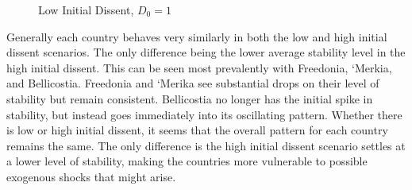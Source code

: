 \documentclass[12pt]{article}
\begin{document}
\begin{spacing}{1.5}
\begin{figure}[htb]
\centering 
{} 
\caption{Low Initial Dissent, $D_0=1$}
\end{figure}

Generally each country behaves very similarly in both the low and high initial dissent scenarios. The only difference being the lower average stability level in the high initial dissent. This can be seen most prevalently with Freedonia, `Merkia, and Bellicostia. Freedonia and `Merika see substantial drops on their level of stability but remain consistent. Bellicostia no longer has the initial spike in stability, but instead goes immediately into its oscillating pattern. Whether there is low or high initial dissent, it seems that the overall pattern for each country remains the same. The only difference is the high initial dissent scenario settles at a lower level of stability, making the countries more vulnerable to possible exogenous shocks that might arise.    


\end{spacing}
\end{document}

